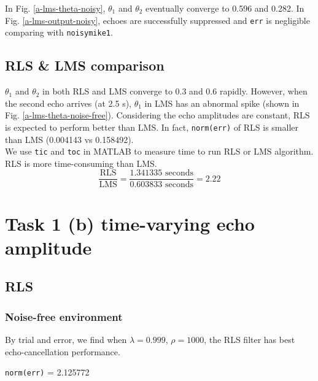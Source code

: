 \documentclass{article}
\begin{document}
In Fig. \ref{a-lms-theta-noisy}, $\theta_1$ and $\theta_2$ eventually converge to 0.596 and 0.282. In Fig. \ref{a-lms-output-noisy}, echoes are successfully suppressed and \texttt{err} is negligible comparing with \texttt{noisymike1}.


\subsection*{RLS \& LMS comparison}
$\theta_1$ and $\theta_2$ in both RLS and LMS converge to 0.3 and 0.6 rapidly. However, when the second echo arrives (at 2.5 s), $\theta_1$ in LMS has an abnormal spike (shown in Fig. \ref{a-lms-theta-noise-free}). Considering the echo amplitudes are constant, RLS is expected to perform better than LMS. In fact, \texttt{norm(err)} of RLS is smaller than LMS (0.004143 vs 0.158492).\\

We use \texttt{tic} and \texttt{toc} in MATLAB to measure time to run RLS or LMS algorithm. RLS is more time-consuming than LMS.
\begin{equation*}
\frac{\text{RLS}}{\text{LMS}} = \frac{1.341335\text{ seconds}}{0.603833\text{ seconds}} = 2.22
\end{equation*}


\section*{Task 1 (b) time-varying echo amplitude}

\subsection*{RLS}

\subsubsection*{Noise-free environment}

By trial and error, we find when $\lambda = 0.999$, $\rho = 1000$, the RLS filter has best echo-cancellation performance.
\begin{center}
\texttt{norm(err)} = 2.125772
\end{center}
\end{document}
